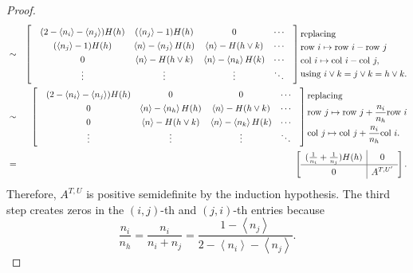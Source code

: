 \documentclass{amsart}
\theoremstyle{definition}
\theoremstyle{remark}
\newcommand{\angl}[1]{\left<#1\right>}              %
\newcommand{\1}{\mathbf{1}}
\numberwithin{equation}{section}
\begin{document}
\begin{proof}
\begin{eqnarray*}
		&\sim &
		\begin{bmatrix}
			&  (2-\angl{n_i}-\angl{n_j})H(h) &(\angl{n_j}-1)H(h) & 0 & \cdots  \\
			&  (\angl{n_j}-1)H(h)&  \angl{n} - \angl{n_j}H(h) & \angl{n} - H(h \vee k) & \cdots \\
			& 0 & \angl{n} - H(h \vee k) & \angl{n} - \angl{n_k}H(k)  & \cdots \\
			& \vdots & \vdots & \vdots & \ddots& 
		\end{bmatrix}
		{\setlength\arraycolsep{1.5pt}
		\begin{aligned} 
            &\text{replacing} \\
			&\text{row } i \mapsto  \text{row } i - \text{row } j \\
			&\text{col } i  \mapsto   \text{col } i - \text{col } j, \\
            &\text{using $i\vee k=j\vee k=h\vee k$.} %
		\end{aligned}}
		\\
		&\sim &
		\begin{bmatrix}
			& %
            (2-\angl{n_i}-\angl{n_j})H(h) &  0 & 0 & \cdots  \\
			&  0 &  \angl{n} - \angl{n_h}H(h) & \angl{n} - H(h \vee k) & \cdots \\
			& 0 & \angl{n} - H(h \vee k) & \angl{n} - \angl{n_k}H(k)  & \cdots \\
			& \vdots & \vdots & \vdots & \ddots& 
		\end{bmatrix}
		{\setlength\arraycolsep{1.5pt}
		\begin{aligned}
			&\text{replacing} \\
            &\text{row } j \mapsto  \text{row } j + \frac{n_i}{n_h}\text{row } i \\
			&\text{col } j \mapsto  \text{col } j + \frac{n_i}{n_h}  \text{col } i.
		\end{aligned}}
		\\
		&= &
		 \left[
\begingroup
\renewcommand*{\arraystretch}{1.3}
  \begin{array}{c|c}
     (\frac{1}{n_i}+\frac{1}{n_j})H(h) & 0\\ \hline
    0 & A^{T,U'}\end{array}\endgroup
  \right].
	\end{eqnarray*}
Therefore, $A^{T,U}$ is positive semidefinite by the induction hypothesis. 
The third step creates zeros in the $(i,j)$-th and $(j,i)$-th entries because
	\[
	\frac{n_i}{n_h} = \frac{n_i}{n_i+n_j}=\frac{1-\angl{n_j}}{2-\angl{n_i}-\angl{n_j}}.
\]
\end{proof}
\end{document}
